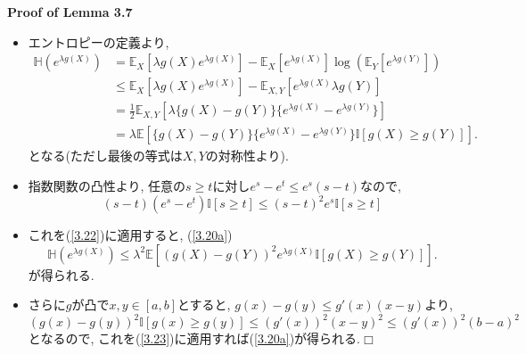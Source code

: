 \documentclass[aspectratio=169, dvipdfmx]{beamer}
\def\qed{\hfill $\Box$}
\newcommand{\ex}{\mathbb{E}}
\begin{document}
\begin{frame}{}{}
{\bf Proof of Lemma 3.7}
\begin{itemize}
    \item エントロピーの定義より,
\begin{align*}
    \mathbb{H}(e^{\lambda g(X)})
    &= \ex_X[\lambda g(X) e^{\lambda g(X)}] - \ex_X[e^{\lambda g(X)}]\log(\ex_Y[e^{\lambda g(Y)}])\\
    &\le \ex_X[\lambda g(X) e^{\lambda g(X)}] - \ex_{X,Y}[e^{\lambda g(X)}\lambda g(Y)] \tag{Jensen's inequality}\\
    &= \frac{1}{2} \ex_{X,Y}\left[\lambda\{g(X)-g(Y)\}\{e^{\lambda g(X)}-e^{\lambda g(Y)}\}\right] \\
    &= \lambda \ex\left[\{g(X)-g(Y)\}\{e^{\lambda g(X)}-e^{\lambda g(Y)}\}\mathbb{I}[g(X) \ge g(Y)]\right]. \tag{3.22}\label{3.22}
\end{align*}
    となる(ただし最後の等式は$X,Y$の対称性より).
\end{itemize}
\end{frame}

\begin{frame}{}
\begin{itemize}
    \item 指数関数の凸性より, 任意の$s\ge t$に対し$e^s - e^t \le e^s(s-t)$なので,
    \[ (s-t)(e^s-e^t)\mathbb{I}[s\ge t] \le (s-t)^2e^s\mathbb{I}[s\ge t] \]
    \item これを(\ref{3.22})に適用すると, (\ref{3.20a})
    \[
        \mathbb{H}(e^{\lambda g(X)})
        \le \lambda^2\ex[(g(X)-g(Y))^2 e^{\lambda g(X)} \mathbb{I}[g(X)\ge g(Y)]].
        \tag{3.23}\label{3.23}
    \]
    が得られる.
    \item さらに$g$が凸で$x,y\in[a,b]$とすると, $g(x)-g(y)\le g'(x)(x-y)$より,
    \[(g(x)-g(y))^2\mathbb{I}[g(x)\ge g(y)] \le (g'(x))^2(x-y)^2\le (g'(x))^2(b-a)^2\]
    となるので, これを(\ref{3.23})に適用すれば(\ref{3.20a})が得られる.\qed
\end{itemize}
\end{frame}
\end{document}
